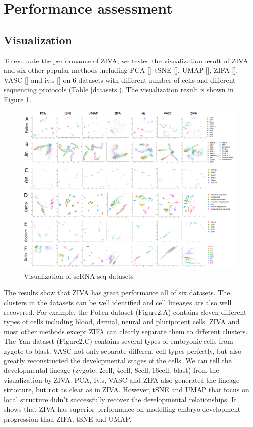\section{Performance assessment}
\subsection{Visualization}
To evaluate the performance of ZIVA, we tested the visualization result of ZIVA and six other popular methods including PCA [], tSNE [], UMAP [], ZIFA [], VASC [] and ivis [] on 6 datasets with different number of cells and different sequencing protocols (Table \ref{datasets}). The visualization result is shown in Figure \ref{vis}.
\begin{figure}[htb!]
    \centering
    \includegraphics[width=1\textwidth]{figures/myfigures/visualizations.png}
    \caption{Visualization of scRNA-seq datasets}
    \label{vis}
\end{figure}
The results show that ZIVA has great performance all of six datasets. The clusters in the datasets can be well identified and cell lineages are also well recovered. For example, the Pollen dataset (Figure2.A) contains eleven different types of cells including blood, dermal, neural and pluripotent cells. ZIVA and most other methods except ZIFA can clearly separate them to different clusters. \\
The Yan dataset (Figure2.C) contains several types of embryonic cells from zygote to blast. VASC not only separate different cell types perfectly, but also greatly reconstructed the developmental stages of the cells. We can tell the developmental lineage (zygote, 2cell, 4cell, 8cell, 16cell, blast) from the visualization by ZIVA. PCA, Ivis, VASC and ZIFA also generated the lineage structure, but not as clear as in ZIVA. However, tSNE and UMAP that focus on local structure didn’t successfully recover the developmental relationships. It shows that ZIVA has superior performance on modelling embryo development progression than ZIFA, tSNE and UMAP. \\
